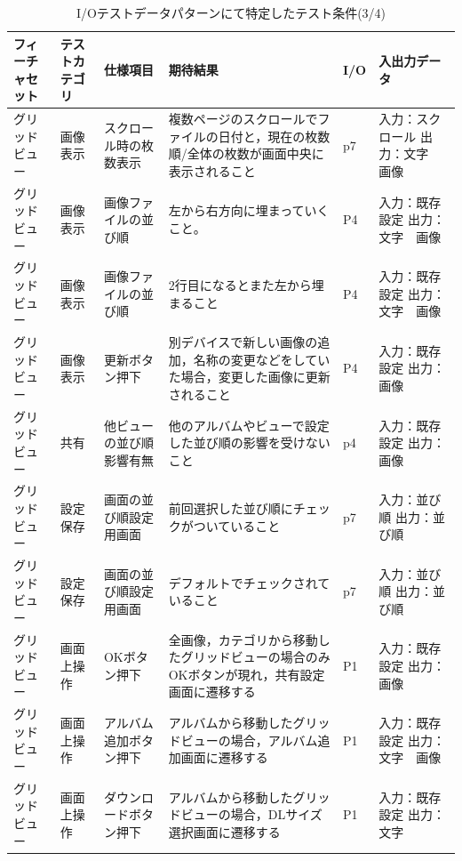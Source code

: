 \begin{table}[htbp]
  \scriptsize
  \centering
  \caption{I/Oテストデータパターンにて特定したテスト条件(3/4)}
  \begin{tabular}{|p{8em}|p{7em}|p{9em}|p{9em}|p{3em}|p{12em}|}
\cline{1-6}   フィーチャセット & テストカテゴリ  & 仕様項目 & 期待結果  & I/O   & 入出力データ \bigstrut\\
    \hline
    グリッドビュー & 画像表示  & スクロール時の枚数表示 & 複数ページのスクロールでファイルの日付と，現在の枚数順/全体の枚数が画面中央に表示されること & p7    & 入力：スクロール
出力：文字　画像 \bigstrut\\
    \hline
    グリッドビュー & 画像表示  & 画像ファイルの並び順 & 左から右方向に埋まっていくこと。 & P4    & 入力：既存設定
出力：文字　画像 \bigstrut\\
    \hline
    グリッドビュー & 画像表示  & 画像ファイルの並び順 & 2行目になるとまた左から埋まること & P4    & 入力：既存設定
出力：文字　画像 \bigstrut\\
    \hline
    グリッドビュー & 画像表示  & 更新ボタン押下 & 別デバイスで新しい画像の追加，名称の変更などをしていた場合，変更した画像に更新されること & P4    & 入力：既存設定
出力：画像 \bigstrut\\
    \hline
    グリッドビュー & 共有    & 他ビューの並び順影響有無 & 他のアルバムやビューで設定した並び順の影響を受けないこと & p4    & 入力：既存設定
出力：画像 \bigstrut\\
    \hline
    グリッドビュー & 設定保存  & 画面の並び順設定用画面 & 前回選択した並び順にチェックがついていること & p7    & 入力：並び順
出力：並び順 \bigstrut\\
    \hline
    グリッドビュー & 設定保存  & 画面の並び順設定用画面 & デフォルトでチェックされていること & p7    & 入力：並び順
出力：並び順 \bigstrut\\
    \hline
    グリッドビュー & 画面上操作 & OKボタン押下 & 全画像，カテゴリから移動したグリッドビューの場合のみOKボタンが現れ，共有設定画面に遷移する & P1    & 入力：既存設定
出力：画像 \bigstrut\\
    \hline
    グリッドビュー & 画面上操作 & \multicolumn{1}{p{7.5em}|}{アルバム追加ボタン押下} & アルバムから移動したグリッドビューの場合，アルバム追加画面に遷移する & P1    & 入力：既存設定
出力：文字　画像 \bigstrut\\
    \hline
    グリッドビュー & 画面上操作 & ダウンロードボタン押下 & アルバムから移動したグリッドビューの場合，DLサイズ選択画面に遷移する & P1    & 入力：既存設定
出力：文字 \bigstrut\\

\end{tabular}
\end{table}
